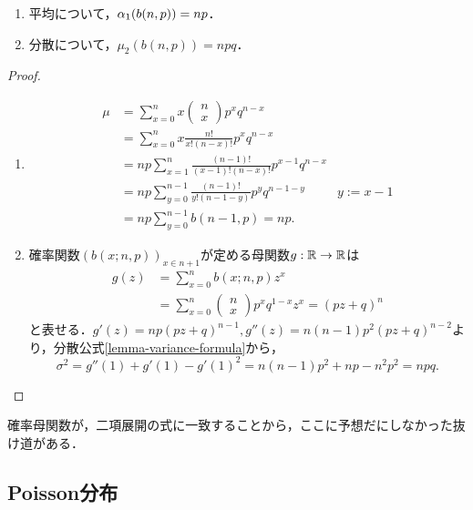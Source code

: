 \documentclass[uplatex,dvipdfmx]{jsreport}
\begin{document}
\begin{proposition}[二項分布の平均と分散]\mbox{}
    \begin{enumerate}
        \item 平均について，$\alpha_1(b(n,p))=np$．
        \item 分散について，$\mu_2(b(n,p))=npq$．
    \end{enumerate}
\end{proposition}
\begin{proof}\mbox{}
    \begin{enumerate}
        \item \begin{align*}
            \mu&=\sum^n_{x=0}x\begin{pmatrix}n\\x\end{pmatrix}p^xq^{n-x}\\
            &=\sum^n_{x=0}x\frac{n!}{x!(n-x)!}p^xq^{n-x}\\
            &=np\sum^n_{x=1}\frac{(n-1)!}{(x-1)!(n-x)!}p^{x-1}q^{n-x}\\
            &=np\sum^{n-1}_{y=0}\frac{(n-1)!}{y!(n-1-y)}p^yq^{n-1-y}&y:=x-1\\
            &=np\sum^{n-1}_{y=0}b(n-1,p)=np.
        \end{align*}
        \item 確率関数$(b(x;n,p))_{x\in n+1}$が定める母関数$g:\mathbb{R}\to\mathbb{R}$は
        \begin{align*}
            g(z)&=\sum^n_{x=0}b(x;n,p)z^x\\
            &=\sum^n_{x=0}\begin{pmatrix}n\\x\end{pmatrix}p^xq^{1-x}z^x
            =(pz+q)^n
        \end{align*}
        と表せる．$g'(z)=np(pz+q)^{n-1},g''(z)=n(n-1)p^2(pz+q)^{n-2}$より，分散公式\ref{lemma-variance-formula}から，
        \[\sigma^2=g''(1)+g'(1)-g'(1)^2=n(n-1)p^2+np-n^2p^2=npq.\]
    \end{enumerate}
\end{proof}
\begin{remarks}
    確率母関数が，二項展開の式に一致することから，ここに予想だにしなかった抜け道がある．
\end{remarks}

\subsection{Poisson分布}
\end{document}
